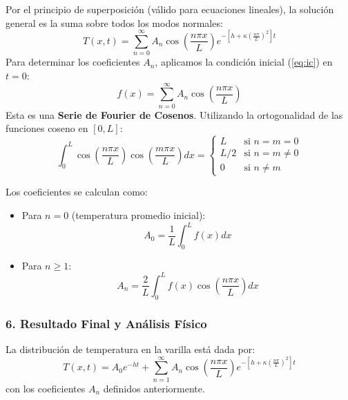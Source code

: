 \documentclass[a4paper]{article}
\begin{document}
Por el principio de superposición (válido para ecuaciones lineales), la solución general es la suma sobre todos los modos normales:
\begin{equation}
T(x, t) = \sum_{n=0}^{\infty} A_n \cos\left(\frac{n\pi x}{L}\right) e^{-\left[h + \kappa \left(\frac{n\pi}{L}\right)^2\right]t}
\end{equation}
Para determinar los coeficientes $A_n$, aplicamos la condición inicial (\ref{eq:ic}) en $t=0$:
\begin{equation}
f(x) = \sum_{n=0}^{\infty} A_n \cos\left(\frac{n\pi x}{L}\right)
\end{equation}
Esta es una \textbf{Serie de Fourier de Cosenos}. Utilizando la ortogonalidad de las funciones coseno en $[0, L]$:
\begin{equation}
\int_0^L \cos\left(\frac{n\pi x}{L}\right) \cos\left(\frac{m\pi x}{L}\right) dx = \begin{cases} L & \text{si } n=m=0 \\ L/2 & \text{si } n=m \neq 0 \\ 0 & \text{si } n \neq m \end{cases}
\end{equation}

Los coeficientes se calculan como:
\begin{itemize}
    \item Para $n=0$ (temperatura promedio inicial):
    \begin{equation}
    A_0 = \frac{1}{L} \int_0^L f(x) dx
    \end{equation}
    \item Para $n \geq 1$:
    \begin{equation}
    A_n = \frac{2}{L} \int_0^L f(x) \cos\left(\frac{n\pi x}{L}\right) dx
    \end{equation}
\end{itemize}

\subsubsection{6. Resultado Final y Análisis Físico}

La distribución de temperatura en la varilla está dada por:
\begin{equation}
\boxed{T(x, t) = A_0 e^{-ht} + \sum_{n=1}^{\infty} A_n \cos\left(\frac{n\pi x}{L}\right) e^{-\left[h + \kappa \left(\frac{n\pi}{L}\right)^2\right]t}}
\end{equation}
con los coeficientes $A_n$ definidos anteriormente.
\end{document}
